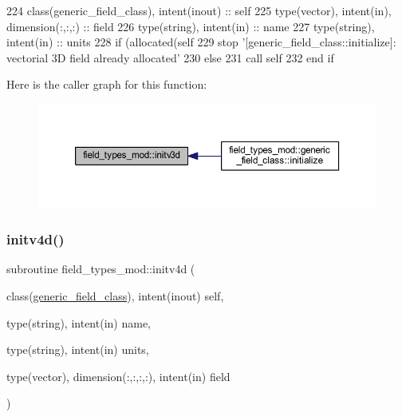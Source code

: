\begin{DoxyCode}
224     \textcolor{keywordtype}{class}(generic\_field\_class), \textcolor{keywordtype}{intent(inout)} :: self
225     \textcolor{keywordtype}{type}(vector), \textcolor{keywordtype}{intent(in)}, \textcolor{keywordtype}{dimension(:,:,:)} :: field
226     \textcolor{keywordtype}{type}(string), \textcolor{keywordtype}{intent(in)} :: name
227     \textcolor{keywordtype}{type}(string), \textcolor{keywordtype}{intent(in)} :: units
228     \textcolor{keywordflow}{if} (\textcolor{keyword}{allocated}(self%
229         stop \textcolor{stringliteral}{'[generic\_field\_class::initialize]: vectorial 3D field already allocated'}
230     \textcolor{keywordflow}{else}
231         \textcolor{keyword}{call }self%
232 \textcolor{keywordflow}{    end if}
\end{DoxyCode}
Here is the caller graph for this function\+:\nopagebreak
\begin{figure}[H]
\begin{center}
\leavevmode
\includegraphics[width=350pt]{namespacefield__types__mod_ae163912444021fda00f4d821d4c85721_icgraph}
\end{center}
\end{figure}
\mbox{\label{namespacefield__types__mod_a6a387f83b9c3e63a795e3bccfff5573b}} 
\subsubsection{\texorpdfstring{initv4d()}{initv4d()}}
{\footnotesize\ttfamily subroutine field\+\_\+types\+\_\+mod\+::initv4d (\begin{DoxyParamCaption}\item[{class(\mbox{\hyperlink{structfield__types__mod_1_1generic__field__class}{generic\+\_\+field\+\_\+class}}), intent(inout)}]{self,  }\item[{type(string), intent(in)}]{name,  }\item[{type(string), intent(in)}]{units,  }\item[{type(vector), dimension(\+:,\+:,\+:,\+:), intent(in)}]{field }\end{DoxyParamCaption})\hspace{0.3cm}{\ttfamily [private]}}



